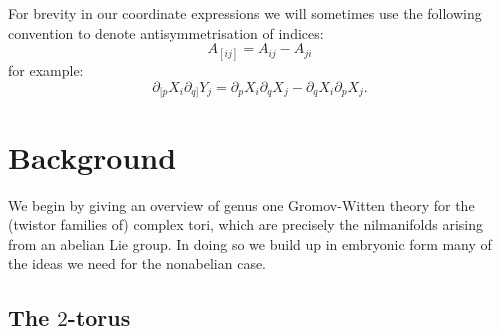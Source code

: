 \documentclass[11pt]{amsart}
\numberwithin{equation}{section}
\theoremstyle{definition}
\theoremstyle{remark}
\begin{document}
For brevity in our coordinate expressions we will sometimes use the following convention to denote antisymmetrisation of indices:
\[A_{[ij]}=A_{ij}-A_{ji}\]
for example:
\[\partial_{[p}X_i\partial_{q]}Y_j=\partial_pX_i\partial_qX_j-\partial_qX_i\partial_pX_j.\]


\section{Background}\label{back}

We begin by giving an overview of genus one Gromov-Witten theory for the (twistor families of) complex tori, which are precisely the nilmanifolds arising from an abelian Lie group. In doing so we build up in embryonic form many of the ideas we need for the nonabelian case.


\subsection{The $2$-torus}\label{2torus}
\end{document}
